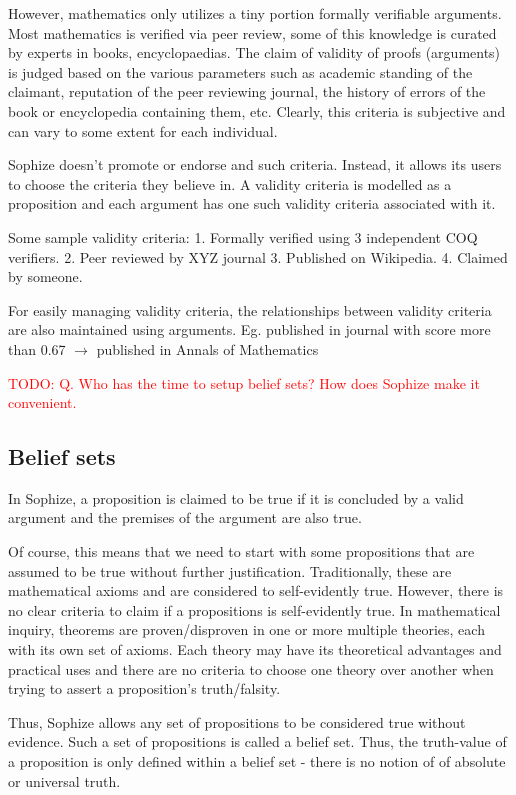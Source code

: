 \documentclass[a4paper]{article}
\newcommand\todo[1]{\textcolor{red}{TODO: #1}}
\begin{document}
However, mathematics only utilizes a tiny portion formally verifiable arguments. Most mathematics is verified via peer review, some of this knowledge is curated by experts in books, encyclopaedias. The claim of validity of proofs (arguments) is judged based on the various parameters such as academic standing of the claimant, reputation of the peer reviewing journal, the history of errors of the book or encyclopedia containing them, etc. Clearly, this criteria is subjective and can vary to some extent for each individual.

Sophize doesn't promote or endorse and such criteria. Instead, it allows its users to choose the criteria they believe in. A validity criteria is modelled as a proposition and each argument has one such validity criteria associated with it.

Some sample validity criteria:
1. Formally verified using 3 independent COQ verifiers.
2. Peer reviewed by XYZ journal
3. Published on Wikipedia.
4. Claimed by someone.

For easily managing validity criteria, the relationships between validity criteria are also maintained using arguments.
Eg. published in journal with score more than 0.67 $\rightarrow$ published in Annals of Mathematics


\todo{Q. Who has the time to setup belief sets? How does Sophize make it 
convenient.}


\subsection{Belief sets}

In Sophize, a proposition is claimed to be true if it is concluded by a valid argument and the premises of the argument are also true.

Of course, this means that we need to start with some propositions that are assumed to be true without further justification. Traditionally, these are mathematical axioms and are considered to self-evidently true. However, there is no clear criteria to claim if a propositions is self-evidently true. In mathematical inquiry, theorems are proven/disproven in one or more multiple theories, each with its own set of axioms. Each theory may have its theoretical advantages and practical uses and there are no criteria to choose one theory over another when trying to assert a proposition's truth/falsity.

Thus, Sophize allows any set of propositions to be considered true without evidence. Such a set of propositions is called a belief set. Thus, the truth-value of a proposition is only defined within a belief set - there is no notion of of absolute or universal truth. 
\end{document}
